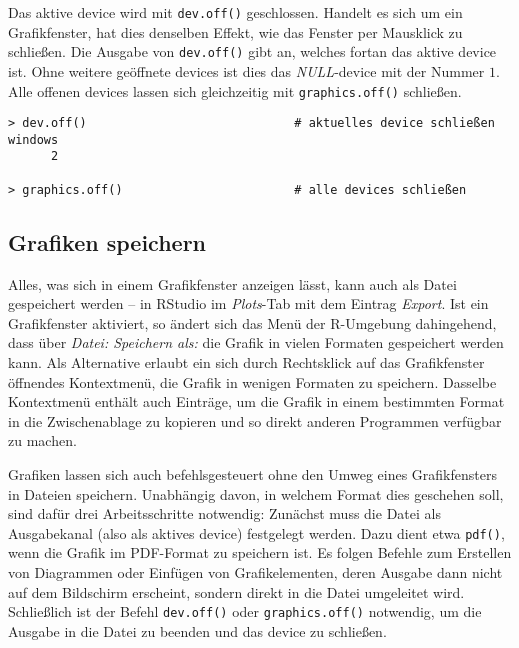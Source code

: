 Das aktive device wird mit \lstinline!dev.off()! geschlossen. Handelt es sich um ein Grafikfenster, hat dies denselben Effekt, wie das Fenster per Mausklick zu schließen. Die Ausgabe von \lstinline!dev.off()! gibt an, welches fortan das aktive device ist. Ohne weitere geöffnete devices ist dies das \emph{NULL}-device mit der Nummer $1$. Alle offenen devices lassen sich gleichzeitig mit \lstinline!graphics.off()! schließen.
\begin{lstlisting}
> dev.off()                             # aktuelles device schließen
windows
      2

> graphics.off()                        # alle devices schließen
\end{lstlisting}

\subsection{Grafiken speichern}
\label{sec:saveDiag}

Alles, was sich in einem Grafikfenster anzeigen lässt, kann auch als Datei gespeichert werden -- in RStudio im \emph{Plots}-Tab mit dem Eintrag \emph{Export}. Ist ein Grafikfenster aktiviert, so ändert sich das Menü der R-Umgebung dahingehend, dass über \emph{Datei: Speichern als:} die Grafik in vielen Formaten gespeichert werden kann. Als Alternative erlaubt ein sich durch Rechtsklick auf das Grafikfenster öffnendes Kontextmenü, die Grafik in wenigen Formaten zu speichern. Dasselbe Kontextmenü enthält auch Einträge, um die Grafik in einem bestimmten Format in die Zwischenablage zu kopieren und so direkt anderen Programmen verfügbar zu machen.

Grafiken lassen sich auch befehlsgesteuert ohne den Umweg eines Grafikfensters in Dateien speichern. Unabhängig davon, in welchem Format dies geschehen soll, sind dafür drei Arbeitsschritte notwendig: Zunächst muss die Datei als Ausgabekanal (also als aktives device) festgelegt werden. Dazu dient etwa \lstinline!pdf()!, wenn die Grafik im PDF-Format zu speichern ist. Es folgen Befehle zum Erstellen von Diagrammen oder Einfügen von Grafikelementen, deren Ausgabe dann nicht auf dem Bildschirm erscheint, sondern direkt in die Datei umgeleitet wird. Schließlich ist der Befehl \lstinline!dev.off()! oder \lstinline!graphics.off()! notwendig, um die Ausgabe in die Datei zu beenden und das device zu schließen.

